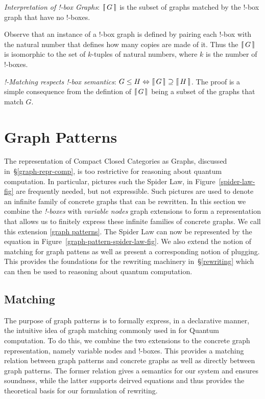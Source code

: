 \documentclass[runningheads]{llncs}
\newcommand{\binterp}[1]{\lceil\hspace{-0.27em}|\, #1\, |\hspace{-0.27em}\rceil}
\begin{document}
\begin{definition}
  \emph{Interpretation of !-box Graphs}: $\binterp{G}$ is the subset
  of graphs matched by the !-box graph that have no !-boxes.
\end{definition}

Observe that an instance of a !-box graph is defined by pairing each
!-box with the natural number that defines how many copies are made of
it. Thus the $\binterp{G}$ is isomorphic to the set of $k$-tuples of
natural numbers, where $k$ is the number of !-boxes.

\begin{theorem}
  \emph{!-Matching respects !-box semantics}: $G \leq H
  \Leftrightarrow \binterp{G} \supseteq \binterp{H}$. The proof is a
  simple consequence from the defintion of $\binterp{G}$ being a
  subset of the graphs that match $G$.
\end{theorem}


\section{Graph Patterns}
\label{sec:patterns}

The representation of Compact Closed Categories as Graphs, discussed
in~\S\ref{graph-repr-comp}, is too restrictive for reasoning about
quantum computation. In particular, pictures such the Spider Law, in
Figure~\ref{spider-law-fig} are frequently needed, but not
expressible. Such pictures are used to denote an infinite family of
concrete graphs that can be rewritten. In this section we combine the
{\em !-boxes} with {\em variable nodes} graph extensions to form a
representation that allows us to finitely express these infinite
families of concrete graphs. We call this extension \ref{graph
  patterns}. The Spider Law can now be represented by the equation in
Figure~\ref{graph-pattern-spider-law-fig}. We also extend the notion
of matching for graph pattens as well as present a corresponding
notion of plugging. This provides the foundations for the rewriting
machinery in~\S\ref{rewriting} which can then be used to reasoning
about quantum computation.

\subsection{Matching}

The purpose of graph patterns is to formally express, in a declarative
manner, the intuitive idea of graph matching commonly used in for
Quantum computation. To do this, we combine the two extensions to the
concrete graph representation, namely variable nodes and !-boxes. This
provides a matching relation between graph patterns and concrete
graphs as well as directly between graph patterns. The former relation
gives a semantics for our system and ensures soundness, while the
latter supports deirved equations and thus provides the theoretical
basis for our formulation of rewriting.
\end{document}
